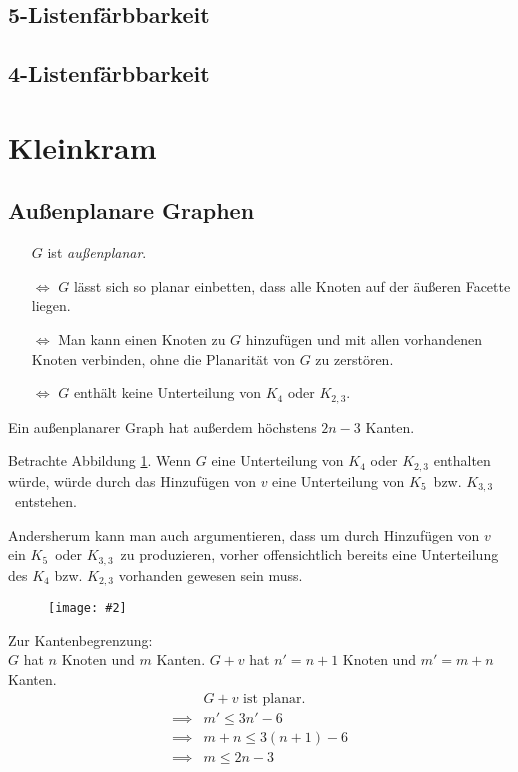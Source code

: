 \documentclass[10pt,a4paper]{article}
\makeatletter
\def\maxwidth#1{\ifdim\Gin@nat@width>#1 #1\else\Gin@nat@width\fi}
\newcommand{\imageFigure}[4]{%
    \begin{figure}[h]%
        \centering%
        {%
            \setlength{\fboxsep}{1pt}%
            \setlength{\fboxrule}{1pt}%
            \texttt{[image: \#2]}%
        }%
        \caption{#1}%
        \label{fig:#4}%
    \end{figure}%
}
\newcommand{\Kf}{$K_5$}
\newcommand{\Kdd}{$K_{3,3}$}
\makeatother
\begin{document}
\subsection{5-Listenfärbbarkeit}
\subsection{4-Listenfärbbarkeit}



\clearpage
\section{Kleinkram}
\subsection{Außenplanare Graphen}
\begin{itemize}
    \item[] $G$ ist \textit{außenplanar}.
    \item[$\iff$] $G$ lässt sich so planar einbetten, dass alle Knoten auf der
        äußeren Facette liegen.
    \item[$\iff$] Man kann einen Knoten zu $G$ hinzufügen und mit allen
        vorhandenen Knoten verbinden, ohne die Planarität von $G$ zu zerstören.
    \item[$\iff$] $G$ enthält keine Unterteilung von $K_4$ oder $K_{2,3}$.
\end{itemize}
Ein außenplanarer Graph hat außerdem höchstens $2n-3$ Kanten.

Betrachte Abbildung \ref{fig:outplane}.
Wenn $G$ eine Unterteilung von $K_4$ oder $K_{2,3}$ enthalten würde, würde
durch das Hinzufügen von $v$ eine Unterteilung von \Kf~bzw. \Kdd~entstehen.

Andersherum kann man auch argumentieren, dass um durch Hinzufügen von $v$ ein
\Kf~oder \Kdd~zu produzieren, vorher offensichtlich bereits eine Unterteilung
des $K_4$ bzw. $K_{2,3}$ vorhanden gewesen sein muss.

\imageFigure{}{outplane.png}{.4}{outplane}

Zur Kantenbegrenzung:\\
$G$ hat $n$ Knoten und $m$ Kanten.
$G+v$ hat $n'=n+1$ Knoten und $m'=m+n$ Kanten.
\begin{align*}
    &G+v \text{ ist planar.}\\
    \implies &m' \leq 3n'-6\\
    \implies &m+n \leq 3(n+1)-6\\
    \implies &m \leq 2n-3
\end{align*}
\end{document}
